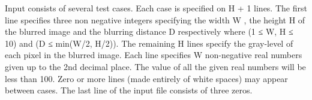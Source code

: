 Input consists of several test cases. Each case is specified on H + 1 lines. The first line specifies three non negative integers specifying the width W , the height H of the blurred image and the blurring distance D respectively where (1 ≤ W, H ≤ 10) and (D ≤ min(W/2, H/2)). The remaining H lines specify the gray-level of each pixel in the blurred image. Each line specifies W non-negative real numbers given up to the 2nd decimal place. The value of all the given real numbers will be less than 100. Zero or more lines (made entirely of white spaces) may appear between cases. The last line of the input file consists of three zeros.